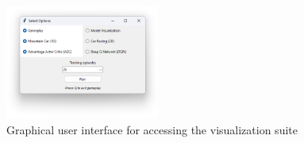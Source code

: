 \begin{figure}[H]
  \centering
  \includegraphics[width=0.45\textwidth]{figures/images/gui.png}
  \caption[Visualization GUI]{Graphical user interface for accessing the visualization suite}
  \label{fig:gui}
\end{figure}
